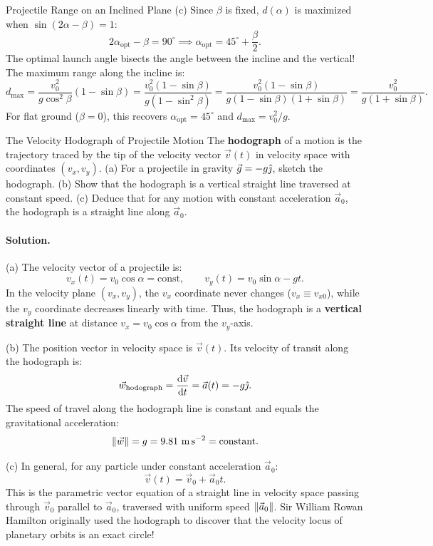 \begin{workedexample}{Projectile Range on an Inclined Plane}
(c) Since $\beta$ is fixed, $d(\alpha)$ is maximized when $\sin(2\alpha - \beta) = 1$:
\[
2\alpha_{\text{opt}} - \beta = 90^\circ \implies \boxed{\alpha_{\text{opt}} = 45^\circ + \frac{\beta}{2}.}
\]
The optimal launch angle bisects the angle between the incline and the vertical!
The maximum range along the incline is:
\[
d_{\max} = \frac{v_0^2}{g\cos^2\beta}(1 - \sin\beta) = \frac{v_0^2(1 - \sin\beta)}{g(1 - \sin^2\beta)} = \frac{v_0^2(1 - \sin\beta)}{g(1 - \sin\beta)(1 + \sin\beta)} = \boxed{\frac{v_0^2}{g(1 + \sin\beta)}.}
\]
For flat ground ($\beta = 0$), this recovers $\alpha_{\text{opt}} = 45^\circ$ and $d_{\max} = v_0^2/g$.
\end{workedexample}

\begin{workedexample}{The Velocity Hodograph of Projectile Motion}
The \textbf{hodograph} of a motion is the trajectory traced by the tip of the velocity vector $\vec{v}(t)$ in velocity space with coordinates $(v_x, v_y)$.
(a) For a projectile in gravity $\vec{g} = -g\hat{\jmath}$, sketch the hodograph.
(b) Show that the hodograph is a vertical straight line traversed at constant speed.
(c) Deduce that for any motion with constant acceleration $\vec{a}_0$, the hodograph is a straight line along $\vec{a}_0$.

\paragraph{Solution.}

(a) The velocity vector of a projectile is:
\[
v_x(t) = v_0\cos\alpha = \text{const}, \qquad v_y(t) = v_0\sin\alpha - gt.
\]
In the velocity plane $(v_x, v_y)$, the $v_x$ coordinate never changes ($v_x \equiv v_{x0}$), while the $v_y$ coordinate decreases linearly with time.
Thus, the hodograph is a \textbf{vertical straight line} at distance $v_x = v_0\cos\alpha$ from the $v_y$-axis.

(b) The position vector in velocity space is $\vec{v}(t)$. Its velocity of transit along the hodograph is:
\[
\vec{w}_{\text{hodograph}} = \frac{\mathrm{d}\vec{v}}{\mathrm{d} t} = \vec{a}(t) = -g\hat{\jmath}.
\]
The speed of travel along the hodograph line is constant and equals the gravitational acceleration:
\[
\norm{\vec{w}} = g = 9.81\ \mathrm{m\,s^{-2}} = \text{constant.}
\]

(c) In general, for any particle under constant acceleration $\vec{a}_0$:
\[
\vec{v}(t) = \vec{v}_0 + \vec{a}_0 t.
\]
This is the parametric vector equation of a straight line in velocity space passing through $\vec{v}_0$ parallel to $\vec{a}_0$, traversed with uniform speed $\left\lVert \vec{a}_0 \right\rVert$. Sir William Rowan Hamilton originally used the hodograph to discover that the velocity locus of planetary orbits is an exact circle!
\end{workedexample}
